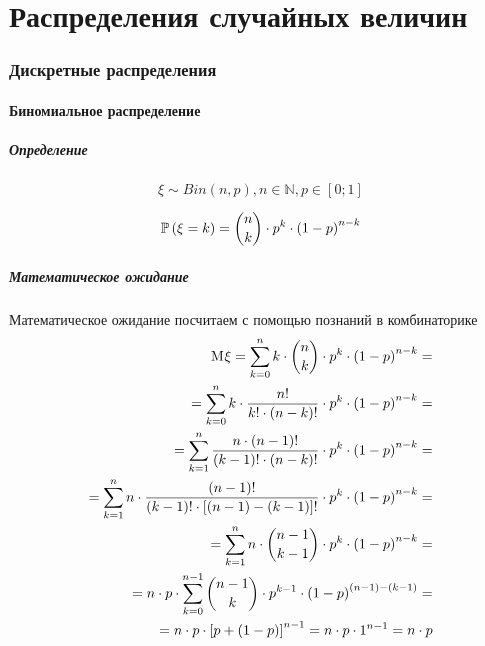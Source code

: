 \part{Распределения случайных величин}
\section{Дискретные распределения}

\subsection{Биномиальное распределение}
\subsubsection{Определение}
$$\xi \sim Bin\left( n,p \right), n \in \mathbb{N}, p \in \left[ 0;1 \right]$$

$$\mathbb{P}\left( \xi = k \right)
    = \binom{n}{k} \cdot p^k \cdot \left( 1-p \right)^{n-k}$$

\subsubsection{Математическое ожидание}
Математическое ожидание посчитаем с помощью познаний в комбинаторике
\begin{align*}
    \mathrm{M}_{} \xi = \sum_{k=0}^{n}
            k \cdot \binom{n}{k} \cdot p^k \cdot \left( 1-p \right)^{n-k} = \\
        = \sum_{k=0}^{n}
            k \cdot \frac{n!}{k! \cdot \left( n-k \right)!}
                \cdot p^k \cdot \left( 1-p \right)^{n-k} = \\
        = \sum_{k=1}^{n}
            \frac{n \cdot \left( n-1 \right)!}{\left( k-1 \right)!
                    \cdot \left( n-k \right)!}
                \cdot p^k \cdot \left( 1-p \right)^{n-k} = \\
        = \sum_{k=1}^{n}
            n \cdot \frac{\left( n-1 \right)!}{\left( k-1 \right)!
                    \cdot \left[ \left(n-1\right)-\left(k-1\right) \right]!}
                \cdot p^k \cdot \left( 1-p \right)^{n-k} = \\
        = \sum_{k=1}^{n}
            n \cdot \binom{n-1}{k-1}
                \cdot p^k \cdot \left( 1-p \right)^{n-k} = \\
        = n \cdot p \cdot \sum_{k=0}^{n-1}
            \binom{n-1}{k} \cdot p^{k-1} \cdot \left( 1-p \right)^{
                \left( n-1 \right)-\left( k-1 \right)} = \\
        = n \cdot p \cdot \left[ p + \left( 1 - p \right) \right]^{n-1}
        = n \cdot p \cdot 1^{n-1} = n \cdot p
\end{align*}

